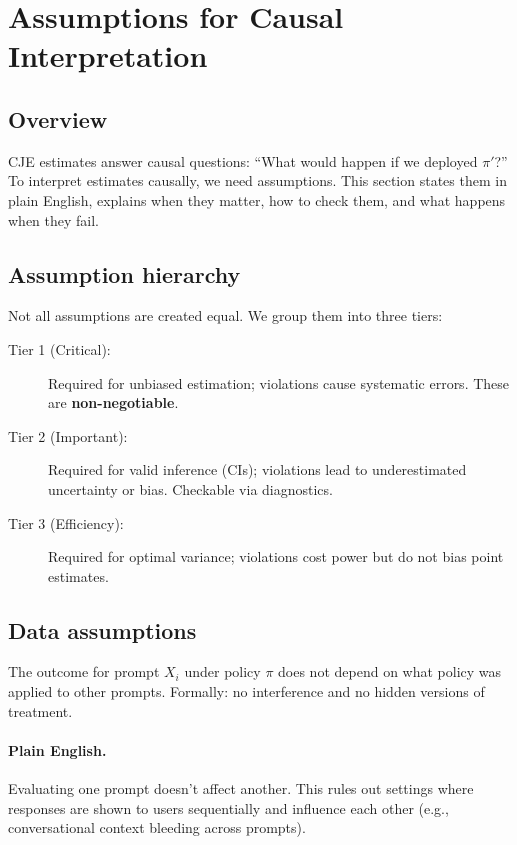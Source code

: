 \section{Assumptions for Causal Interpretation}

\subsection{Overview}

CJE estimates answer causal questions: ``What would happen if we deployed $\pi'$?'' To interpret estimates causally, we need assumptions. This section states them in plain English, explains when they matter, how to check them, and what happens when they fail.

\subsection{Assumption hierarchy}

Not all assumptions are created equal. We group them into three tiers:

\begin{description}
\item[Tier 1 (Critical):] Required for unbiased estimation; violations cause systematic errors. These are \textbf{non-negotiable}.
\item[Tier 2 (Important):] Required for valid inference (CIs); violations lead to underestimated uncertainty or bias. Checkable via diagnostics.
\item[Tier 3 (Efficiency):] Required for optimal variance; violations cost power but do not bias point estimates.
\end{description}

\subsection{Data assumptions}

\begin{assumption}
\label{assum:sutva}
The outcome for prompt $X_i$ under policy $\pi$ does not depend on what policy was applied to other prompts. Formally: no interference and no hidden versions of treatment.
\end{assumption}

\paragraph{Plain English.} Evaluating one prompt doesn't affect another. This rules out settings where responses are shown to users sequentially and influence each other (e.g., conversational context bleeding across prompts).

